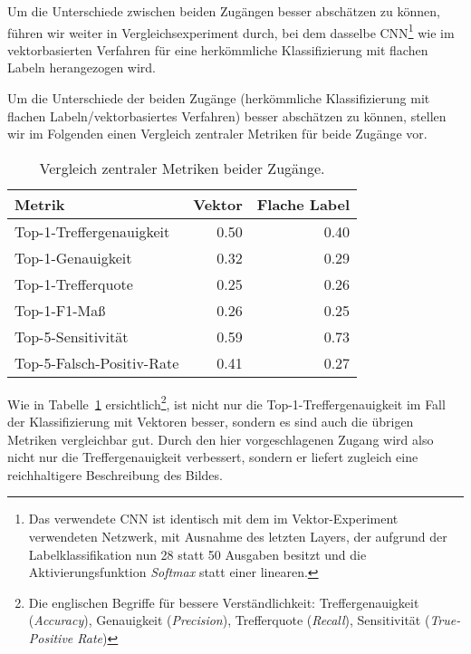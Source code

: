 Um die Unterschiede zwischen beiden Zugängen besser abschätzen zu können, führen wir weiter in Vergleichsexperiment durch, bei dem dasselbe CNN\footnote{Das verwendete CNN ist identisch mit dem im Vektor-Experiment verwendeten Netzwerk, mit Ausnahme des letzten Layers, der aufgrund der Labelklassifikation nun 28 statt 50 Ausgaben besitzt und die Aktivierungsfunktion \emph{Softmax} statt einer linearen.} wie im vektorbasierten Verfahren für eine herkömmliche Klassifizierung mit flachen Labeln herangezogen wird.

Um die Unterschiede der beiden Zugänge (herkömmliche Klassifizierung mit flachen Labeln/vektorbasiertes Verfahren) besser abschätzen zu können, stellen wir im Folgenden einen Vergleich zentraler Metriken für beide Zugänge vor.

\begin{table}
    \centering
    \begin{tabular}{lrr}
    	\toprule
    	Metrik                    &     Vektor & Flache Label \\ \midrule
    	Top-1-Treffergenauigkeit  & \num{0.50} &   \num{0.40} \\
    	Top-1-Genauigkeit         & \num{0.32} &   \num{0.29} \\
    	Top-1-Trefferquote        & \num{0.25} &   \num{0.26} \\
    	Top-1-F1-Maß              & \num{0.26} &   \num{0.25} \\ \midrule
    	Top-5-Sensitivität        & \num{0.59} &   \num{0.73} \\
    	Top-5-Falsch-Positiv-Rate & \num{0.41} &   \num{0.27} \\
         \bottomrule
    \end{tabular}
    \caption{Vergleich zentraler Metriken beider Zugänge.}
    \label{tab:results}
\end{table}

Wie in Tabelle~\ref{tab:results} ersichtlich\footnote{Die englischen Begriffe für bessere Verständlichkeit: Treffergenauigkeit (\emph{Accuracy}), Genauigkeit (\emph{Precision}), Trefferquote (\emph{Recall}), Sensitivität (\emph{True-Positive Rate})}, ist nicht nur die \mbox{Top-1-Treffergenauigkeit} im Fall der Klassifizierung mit Vektoren besser, sondern es sind auch die übrigen Metriken vergleichbar gut. Durch den hier vorgeschlagenen Zugang wird also nicht nur die Treffergenauigkeit verbessert, sondern er liefert zugleich eine reichhaltigere Beschreibung des Bildes.


